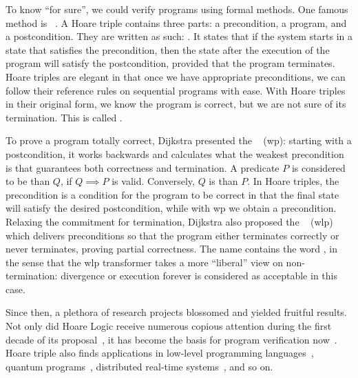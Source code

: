 To know ``for sure'', we could verify programs using formal methods. 
One famous method is ~\cite{hoare69}. 
A Hoare triple contains three parts: a precondition, a program, and a postcondition. 
They are written as such: .
It states that if the system starts in a state that satisfies the precondition, then the state after the execution of the program will satisfy the postcondition, provided that the program terminates.
Hoare triples are elegant in that once we have appropriate preconditions, we can follow their reference rules on sequential programs with ease. 
With Hoare triples in their original form, we know the program is correct, but we are not sure of its termination. 
This is called . 

To prove a program totally correct, Dijkstra presented the ~\cite{dijkstra75} (wp): starting with a postcondition, it works backwards and calculates what the weakest precondition is that guarantees both correctness and termination. 
A predicate $P$ is considered to be  than $Q$, if $Q\implies P$ is valid. 
Conversely, $Q$ is  than $P$. 
In Hoare triples, the precondition is a  condition for the program to be correct in that the final state will satisfy the desired postcondition, while with wp we obtain a  precondition. 
Relaxing the commitment for termination, Dijkstra also proposed the ~\cite{dijkstra90} (wlp) which delivers preconditions so that the program either terminates correctly or never terminates, proving partial correctness. 
The name contains the word , in the sense that the wlp transformer takes a more ``liberal'' view on non-termination: divergence or execution forever is considered as acceptable in this case. 

Since then, a plethora of research projects blossomed and yielded fruitful results. 
Not only did Hoare Logic receive numerous copious attention during the first decade of its proposal~\cite{apt81}, it has become the basis for program verification now~\cite{gordon2010ForwardHoare}. 
Hoare triple also finds applications in low-level programming languages~\cite{myreen07}, quantum programs~\cite{zhou19}, distributed real-time systems~\cite{hooman1994extending}, and so on. 

